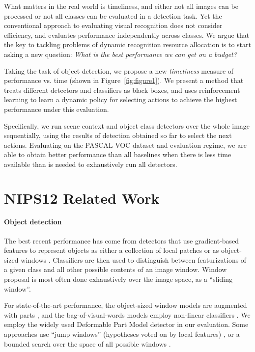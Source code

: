 What matters in the real world is timeliness, and either not all images can be processed or not all classes can be evaluated in a detection task.
Yet the conventional approach to evaluating visual recognition does not consider efficiency, and evaluates performance independently across classes.
We argue that the key to tackling problems of dynamic recognition resource allocation is to start asking a new question:
\emph{What is the best performance we can get on a budget?}

Taking the task of object detection, we propose a new \emph{timeliness} measure of performance vs. time (shown in Figure~\ref{fig:figure1}).
We present a method that treats different detectors and classifiers as black boxes, and uses reinforcement learning to learn a dynamic policy for selecting actions to achieve the highest performance under this evaluation.

Specifically, we run scene context and object class detectors over the whole image sequentially, using the results of detection obtained so far to select the next actions.
Evaluating on the PASCAL VOC dataset and evaluation regime, we are able to obtain better performance than all baselines when there is less time available than is needed to exhaustively run all detectors.

\section{NIPS12 Related Work}

\paragraph{Object detection}
The best recent performance has come from detectors that use gradient-based features to represent objects as either a collection of local patches or as object-sized windows \cite{Dalal2005,Lowe2004}.
Classifiers are then used to distinguish between featurizations of a given class and all other possible contents of an image window.
Window proposal is most often done exhaustively over the image space, as a ``sliding window''.

For state-of-the-art performance, the object-sized window models are augmented with parts \cite{Felzenszwalb2010a}, and the bag-of-visual-words models employ non-linear classifiers \cite{Vedaldi2009}.
We employ the widely used Deformable Part Model detector \cite{Felzenszwalb2010a} in our evaluation.
Some approaches use ``jump windows'' (hypotheses voted on by local features) \cite{Vedaldi2009,Vijayanarasimhan2011}, or a bounded search over the space of all possible windows \cite{Lampert2008a}.

